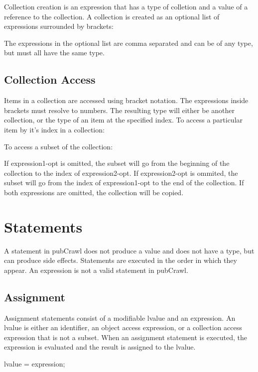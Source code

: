 \documentclass[oneside]{book}
\begin{document}
Collection creation is an expression that has a type of colletion and a value of a reference to the collection. A collection is created as an optional list of expressions surrounded by brackets:
\begin{code}
\end{code}
The expressions in the optional list are comma separated and can be of any type, but must all have the same type.

\subsection{Collection Access}

Items in a collection are accessed using bracket notation. The expressions inside brackets must resolve to numbers. The resulting type will either be another collection, or the type of an item at the specified index. To access a particular item by it's index in a collection:
\begin{code}
[ expression ]
\end{code}
To access a subset of the collection:
\begin{code}
\end{code}
If expression1-opt is omitted, the subset will go from the beginning of the collection to the index of expression2-opt. If expression2-opt is ommited, the subset will go from the index of expression1-opt to the end of the collection. If both expressions are omitted, the collection will be copied.

\section{Statements}

A statement in pubCrawl does not produce a value and does not have a type, but can produce side effects. Statements are executed in the order in which they appear. An expression is not a valid statement in pubCrawl.

\subsection{Assignment}

Assignment statements consist of a modifiable lvalue and an expression. An lvalue is either an identifier, an object access expression, or a collection access expression that is not a subset. When an assignment statement is executed, the expression is evaluated and the result is assigned to the lvalue.
\begin{code}
lvalue = expression;
\end{code}
\end{document}
